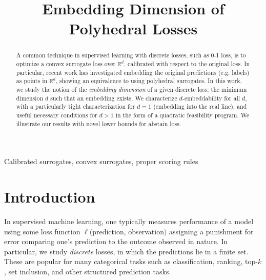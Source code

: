 \documentclass[final]{colt2020} %
\title[Embedding dimension]{Embedding Dimension of Polyhedral Losses}
\newcommand{\reals}{\mathbb{R}}
\newcommand{\Ind}[1]{\mathbf{1}\{#1\}}
\begin{document}
\maketitle

\begin{abstract}%
  A common technique in supervised learning with discrete losses, such as 0-1 loss, is to optimize a convex surrogate loss over $\reals^d$, calibrated with respect to the original loss.
  In particular, recent work has investigated embedding the original predictions (e.g. labels) as points in $\reals^d$, showing an equivalence to using polyhedral surrogates.
  In this work, we study the notion of the \emph{embedding dimension} of a given discrete loss: the minimum dimension $d$ such that an embedding exists.
  We characterize $d$-embeddability for all $d$, with a particularly tight characterization for $d=1$ (embedding into the real line), and useful necessary conditions for $d>1$ in the form of a quadratic feasibility program.
  We illustrate our results with novel lower bounds for abstain loss.
\end{abstract}

\begin{keywords}%
  Calibrated surrogates, convex surrogates, proper scoring rules%
\end{keywords}


\section{Introduction}
In supervised machine learning, one typically measures performance of a model using some loss function $\ell($prediction, observation$)$ assigning a punishment for error comparing one's prediction to the outcome observed in nature.
In particular, we study \emph{discrete} losses, in which the predictions lie in a finite set.
These are popular for many categorical tasks such as classification, ranking, top-$k$, set inclusion, and other structured prediction tasks.
\end{document}
